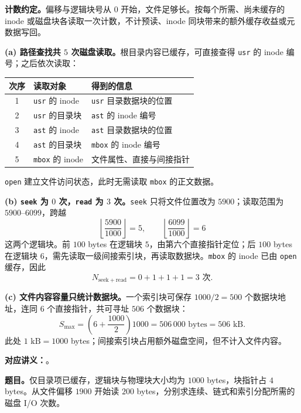 \begin{checkedsolution}
\textbf{计数约定。}偏移与逻辑块号从 $0$ 开始，文件足够长。按每个所需、尚未缓存的 inode 或磁盘块各读取一次计数，不计预读、inode 同块带来的额外缓存收益或元数据写回。

\textbf{(a) 路径查找共 $5$ 次磁盘读取。}根目录内容已缓存，可直接查得 \texttt{usr} 的 inode 编号；之后依次读取：
\begin{center}
\begin{tabularx}{\textwidth}{@{}cl>{\raggedright\arraybackslash}X@{}}
\toprule
次序 & 读取对象 & 得到的信息 \\
\midrule
1 & \texttt{usr} 的 inode & \texttt{usr} 目录数据块的位置 \\
2 & \texttt{usr} 的目录块 & \texttt{ast} 的 inode 编号 \\
3 & \texttt{ast} 的 inode & \texttt{ast} 目录数据块的位置 \\
4 & \texttt{ast} 的目录块 & \texttt{mbox} 的 inode 编号 \\
5 & \texttt{mbox} 的 inode & 文件属性、直接与间接指针 \\
\bottomrule
\end{tabularx}
\end{center}
\texttt{open} 建立文件访问状态，此时无需读取 \texttt{mbox} 的正文数据。

\textbf{(b) \texttt{seek} 为 $0$ 次，\texttt{read} 为 $3$ 次。}\texttt{seek} 只将文件位置改为 $5900$；读取范围为 $5900$--$6099$，跨越
\[
  \left\lfloor\frac{5900}{1000}\right\rfloor=5,
  \qquad
  \left\lfloor\frac{6099}{1000}\right\rfloor=6
\]
这两个逻辑块。前 $100$ bytes 在逻辑块 $5$，由第六个直接指针定位；后 $100$ bytes 在逻辑块 $6$，需先读取一级间接索引块，再读取数据块。\texttt{mbox} 的 inode 已由 \texttt{open} 缓存，因此
\[
  \boxed{N_{\mathrm{seek+read}}=0+1+1+1=3\text{ 次}}.
\]

\textbf{(c) 文件内容容量只统计数据块。}一个索引块可保存 $1000/2=500$ 个数据块地址，连同 $6$ 个直接指针，共可寻址 $506$ 个数据块：
\[
  \boxed{S_{\max}=\left(6+\frac{1000}{2}\right)1000
  =506\,000\text{ bytes}=506\text{ kB}}.
\]
此处 $1\text{ kB}=1000$ bytes；间接索引块占用额外磁盘空间，但不计入文件内容。
\end{checkedsolution}


\textbf{对应讲义：}。

\textbf{题目。}仅目录项已缓存，逻辑块与物理块大小均为 $1000$ bytes，块指针占 $4$ bytes。从文件偏移 $1900$ 开始读 $200$ bytes，分别求连续、链式和索引分配所需的磁盘 I/O 次数。


